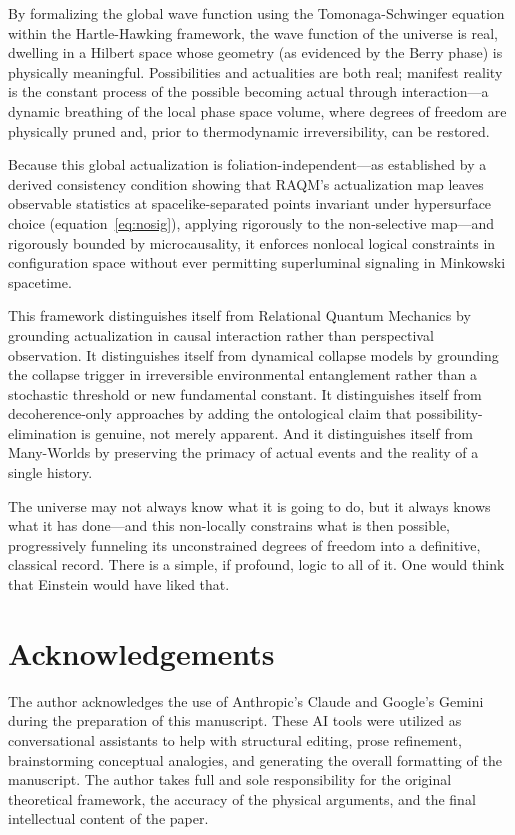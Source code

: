 \documentclass[11pt,a4paper]{article}
\theoremstyle{plain}
\theoremstyle{definition}
\theoremstyle{remark}
\begin{document}
By formalizing the global wave function using the Tomonaga-Schwinger equation
within the Hartle-Hawking framework, the wave function of the universe is real,
dwelling in a Hilbert space whose geometry (as evidenced by the Berry phase) is
physically meaningful. Possibilities and actualities are both real; manifest
reality is the constant process of the possible becoming actual through
interaction---a dynamic breathing of the local phase space volume, where degrees of
freedom are physically pruned and, prior to thermodynamic irreversibility, can be
restored.

Because this global actualization is foliation-independent---as established by a
derived consistency condition showing that RAQM's actualization map leaves
observable statistics at spacelike-separated points invariant under hypersurface
choice (equation~\ref{eq:nosig}), applying rigorously to the non-selective
map---and rigorously bounded by microcausality, it enforces nonlocal logical
constraints in configuration space without ever permitting superluminal signaling
in Minkowski spacetime.

This framework distinguishes itself from Relational Quantum Mechanics by grounding
actualization in causal interaction rather than perspectival observation. It
distinguishes itself from dynamical collapse models by grounding the collapse
trigger in irreversible environmental entanglement rather than a stochastic
threshold or new fundamental constant. It distinguishes itself from
decoherence-only approaches by adding the ontological claim that
possibility-elimination is genuine, not merely apparent. And it distinguishes
itself from Many-Worlds by preserving the primacy of actual events and the reality
of a single history.

The universe may not always know what it is going to do, but it always knows what
it has done---and this non-locally constrains what is then possible, progressively
funneling its unconstrained degrees of freedom into a definitive, classical record.
There is a simple, if profound, logic to all of it. One would think that Einstein
would have liked that.

\section*{Acknowledgements}
The author acknowledges the use of Anthropic's Claude and Google's Gemini during
the preparation of this manuscript. These AI tools were utilized as conversational
assistants to help with structural editing, prose refinement, brainstorming
conceptual analogies, and generating the overall formatting of the manuscript. The
author takes full and sole responsibility for the original theoretical framework,
the accuracy of the physical arguments, and the final intellectual content of the
paper.
\end{document}
